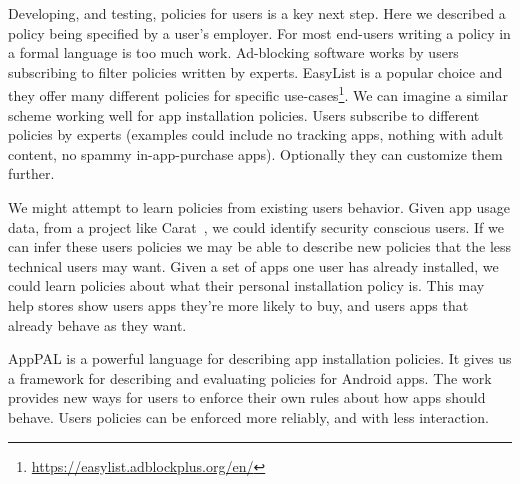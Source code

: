 \documentclass[]{llncs}
\begin{document}
Developing, and testing, policies for users is a key next step.
Here we described a policy being specified by a user's employer.
For most end-users writing a policy in a formal language is too much work.
Ad-blocking software works by users subscribing to filter policies written by experts.
EasyList is a popular choice and they offer many different policies for specific use-cases\footnote{\url{https://easylist.adblockplus.org/en/}}.
We can imagine a similar scheme working well for app installation policies.
Users subscribe to different policies by experts (examples could include no tracking apps, nothing with adult content, no spammy in-app-purchase apps).
Optionally they can customize them further.

We might attempt to learn policies from existing users behavior.
Given app usage data, from a project like Carat~\cite{Oliner:2013ht}, we could identify security conscious users.
If we can infer these users policies we may be able to describe new policies that the less technical users may want.
Given a set of apps one user has already installed, we could learn policies about what their personal installation policy is.
This may help stores show users apps they're more likely to buy, and users apps that already behave as they want.

AppPAL is a powerful language for describing app installation policies.
It gives us a framework for describing and evaluating policies for Android apps.
The work provides new ways for users to enforce their own rules about how apps should behave.
Users policies can be enforced more reliably, and with less interaction.



\end{document}
